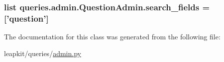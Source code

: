 \hypertarget{classqueries_1_1admin_1_1_question_admin_ac391e9c4221c6acc9ec00c9828f1eee8}{
\subsubsection[{search\-\_\-fields}]{\setlength{\rightskip}{0pt plus 5cm}list queries.\-admin.\-Question\-Admin.\-search\-\_\-fields = \mbox{[}'question'\mbox{]}\hspace{0.3cm}{\ttfamily [static]}}}\label{classqueries_1_1admin_1_1_question_admin_ac391e9c4221c6acc9ec00c9828f1eee8}


The documentation for this class was generated from the following file\-:\begin{DoxyCompactItemize}
\item 
leapkit/queries/\hyperlink{queries_2admin_8py}{admin.\-py}\end{DoxyCompactItemize}
